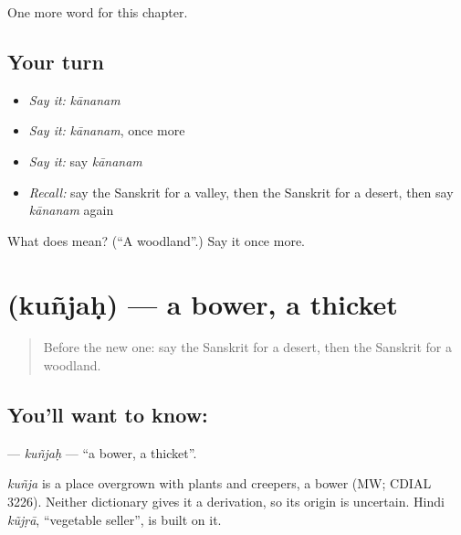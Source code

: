 \begin{grammarlens}[title={What you've built}]
One more word for this chapter.
\end{grammarlens}

\subsection*{Your turn}
\begin{itemize}
\raggedright
  \item \emph{Say it:} \emph{kānanam}
  \item \emph{Say it:} \emph{kānanam}, once more
  \item \emph{Say it:} say \emph{kānanam}
  \item \emph{Recall:} say the Sanskrit for a valley, then the Sanskrit for a desert, then say \emph{kānanam} again
\end{itemize}

\begin{tcolorbox}[breakable,colback=teal!4,colframe=teal!35!black,title={Before you move on}]
What does  mean? (\textquotedblleft{}A woodland\textquotedblright{}.) Say it once more.
\end{tcolorbox}
\section[\texorpdfstring{\sk{कुञ्जः} (kuñjaḥ)}{कुञ्जः (kuñjaḥ)}]{ (kuñjaḥ) — a bower, a thicket}

\label{lesson:SA-C225-kunjah}



\begin{quote}
Before the new one: say the Sanskrit for a desert, then the Sanskrit for a woodland.
\end{quote}

\subsection*{You'll want to know: }
\textbf{} — \emph{kuñjaḥ} — \textquotedblleft{}a bower, a thicket\textquotedblright{}.

\begin{cousinweb}
\emph{kuñja} is a place overgrown with plants and creepers, a bower (MW; CDIAL 3226). Neither dictionary gives it a derivation, so its origin is uncertain. Hindi \emph{kũjṛā}, \textquotedblleft{}vegetable seller\textquotedblright{}, is built on it.
\end{cousinweb}

